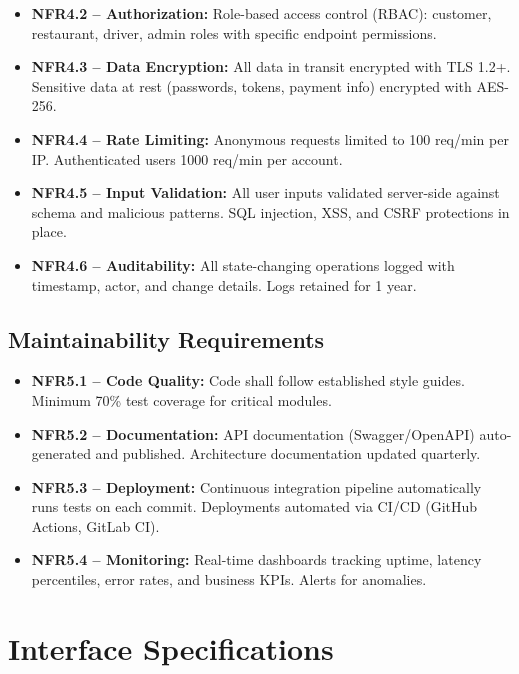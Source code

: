 \documentclass[12pt,a4paper]{report}
\begin{document}
\begin{itemize}
\begin{itemize}
    \item \textbf{NFR4.2 -- Authorization:} Role-based access control (RBAC): customer, restaurant, driver, admin roles with specific endpoint permissions.
    
    \item \textbf{NFR4.3 -- Data Encryption:}  All data in transit encrypted with TLS 1.2+. Sensitive data at rest (passwords, tokens, payment info) encrypted with AES-256.
    
    \item \textbf{NFR4.4 -- Rate Limiting:} Anonymous requests limited to 100 req/min per IP. Authenticated users 1000 req/min per account.
    
    \item \textbf{NFR4.5 -- Input Validation:} All user inputs validated server-side against schema and malicious patterns. SQL injection, XSS, and CSRF protections in place.
    
    \item \textbf{NFR4.6 -- Auditability:} All state-changing operations logged with timestamp, actor, and change details. Logs retained for 1 year.
\end{itemize}

\subsection{Maintainability Requirements}

\begin{itemize}
    \item \textbf{NFR5.1 -- Code Quality:} Code shall follow established style guides. Minimum 70\% test coverage for critical modules.
    
    \item \textbf{NFR5.2 -- Documentation:} API documentation (Swagger/OpenAPI) auto-generated and published. Architecture documentation updated quarterly.
    
    \item \textbf{NFR5.3 -- Deployment:} Continuous integration pipeline automatically runs tests on each commit. Deployments automated via CI/CD (GitHub Actions, GitLab CI).
    
    \item \textbf{NFR5.4 -- Monitoring:} Real-time dashboards tracking  uptime, latency percentiles, error rates, and business KPIs. Alerts for anomalies.
\end{itemize}

\section{Interface Specifications}


\end{itemize}
\end{document}
